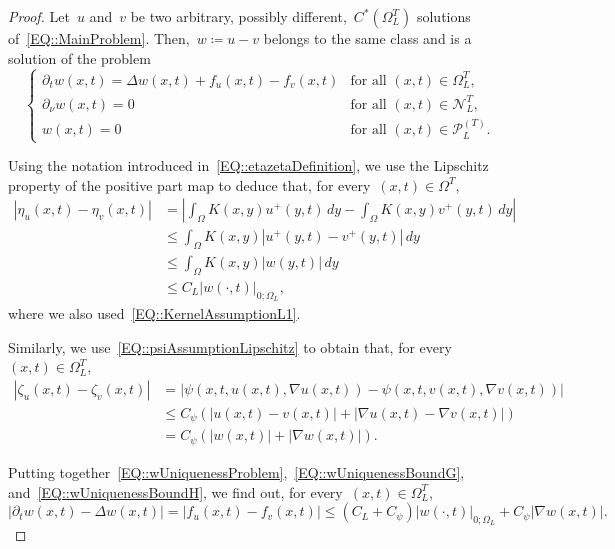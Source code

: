 \documentclass[12pt,a4paper]{amsart}
\numberwithin{equation}{section}
\theoremstyle{definition}
\theoremstyle{remark}
\newcommand{\abs}[1]{\left\lvert#1\right\rvert}
\renewcommand{\leq}{\leqslant}
\begin{document}
\begin{proof}
    Let~$u$ and~$v$ be two arbitrary, possibly different,~$C^\ast\left(\Omega_L^T\right)$ solutions of~\eqref{EQ::MainProblem}. Then,~$w\coloneq u-v$ belongs to the same class and is a solution of the problem
    \begin{equation}\label{EQ::wUniquenessProblem}
        \begin{cases}
            \partial_{t} w(x,t) = \Delta w(x,t) + f_u(x,t) - f_v(x,t)&\text{for all }(x,t) \in \Omega_L^T,\\
            \partial_{\nu} w(x,t) = 0&\text{for all }(x,t) \in \mathcal{N}_L^T,\\
            w(x,t) = 0&\text{for all }(x,t) \in \mathcal{P}_L^{(T)}.
        \end{cases}
    \end{equation}

    Using the notation introduced in~\eqref{EQ::etazetaDefinition}, we use the Lipschitz property of the positive part map to deduce that, for every~$(x,t) \in \Omega^T$,
    \begin{equation}\label{EQ::wUniquenessBoundG}
        \begin{split}    
            \abs{\eta_u(x,t)-\eta_v(x,t)} &= \abs{\int_\Omega K(x,y)u^+(y,t)\,dy - \int_\Omega K(x,y)v^+(y,t)\,dy}\\
                &\leq \int_\Omega K(x,y) \abs{u^+(y,t)-v^+(y,t)}\,dy\\
                &\leq \int_\Omega K(x,y) \abs{w(y,t)}\,dy\\
                &\leq C_L \abs{w(\cdot, t)}_{0; \Omega_L},
        \end{split}
    \end{equation}
    where we also used~\eqref{EQ::KernelAssumptionL1}.

    Similarly, we use~\eqref{EQ::psiAssumptionLipschitz} to obtain that, for every~$(x,t) \in \Omega_L^T$,
    \begin{align}\label{EQ::wUniquenessBoundH}
        \abs{\zeta_u(x,t)-\zeta_v(x,t)} &= \abs{\psi(x,t,u(x,t),\nabla u(x,t))-\psi(x,t,v(x,t),\nabla v(x,t))}\\
            &\leq C_\psi \left(\abs{u(x,t)-v(x,t)} + \abs{\nabla u(x,t)-\nabla v(x,t)}\right)\\
            &= C_\psi \left(\abs{w(x,t)} + \abs{\nabla w(x,t)}\right).
    \end{align}

    Putting together~\eqref{EQ::wUniquenessProblem},~\eqref{EQ::wUniquenessBoundG}, and~\eqref{EQ::wUniquenessBoundH}, we find out, for every~$(x,t) \in \Omega_L^T$,
    \begin{equation}\label{EQ::dtwLapwControl}
        \abs{\partial_{t} w(x,t) - \Delta w(x,t)} = \abs{f_u(x,t)-f_v(x,t)}\leq \left(C_L + C_\psi\right)\abs{w(\cdot,t)}_{0; \Omega_L} + C_\psi \abs{\nabla w(x,t)}.
    \end{equation}
    

\end{proof}
\end{document}
